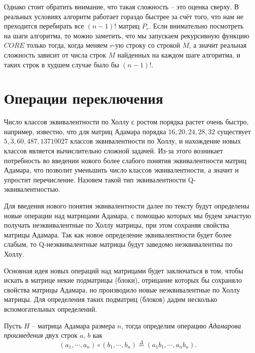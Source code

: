 Однако стоит обратить внимание, что такая сложность -- это оценка сверху. В реальных условиях алгоритм работает гораздо быстрее за счёт того, что нам не преходится перебирать все $(n-1)!$ матриц $P_r$. Если внимательно посмотреть на шаги алгоритма, то можно заметить, что мы запускаем рекурсивную функцию $CORE$ только тогда, когда меняем $r$-ую строку со строкой $M$, а значит реальная сложность зависит от числа строк $M$ найденных на каждом шаге алгоритма, и таких строк в худшем случае было бы $(n-1)!$.

\section{Операции переключения}

Число классов эквивалентности по Холлу с ростом порядка растет очень быстро, например, известно, что для матриц Адамара порядка $16, 20, 24, 28, 32$ существует $5, 3, 60, 487, 13710027$ классов эквивалентности по Холлу, и нахождение новых классов является вычислительно сложной задачей. Из-за этого возникает потребность во введении нового более слабого понятия эквивалентности матриц Адамара, что позволит уменьшить число классов эквивалентности, а значит и упростит перечисление. Назовем такой тип эквивалентности Q-эквивалентностью.

Для введения нового понятия эквивалентности далее по тексту будут определены новые операции над матрицами Адамара, с помощью которых мы будем зачастую получать неэквивалентные по Холлу матрицы, при этом сохраняя свойства матрицы Адамара. Так как новое определение эквивалентности будет более слабым, то Q-неэквивалентные матрицы будут заведомо неэквивалентны по Холлу.

Основная идея новых операций над матрицами будет заключаться в том, чтобы искать в матрице некие подматрицы (блоки), отрицание которых бы сохраняло свойства матрицы Адамара, но производило новые неэквивалентные по Холлу матрицы. Для определения таких подматриц (блоков) дадим несколько вспомогательных определений.

\begin{Df}\normalfont\label{df:norm3}
    Пусть $H$ -- матрица Адамара размера $n$, тогда определим операцию {\it Адамарова произведения} двух строк $a$, $b$ как
    \begin{equation}
        (a_1, \cdots, a_n) \circ (b_1, \cdots, b_n) \overset{\Delta}{=} (a_1b_1, \cdots, a_nb_n).
    \end{equation}
\end{Df}

